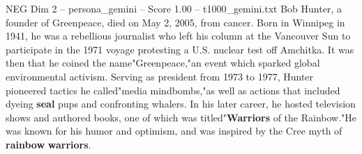 \begin{textsample}{NEG Dim 2 – persona\_gemini – Score 1.00 – t1000\_gemini.txt}  \label{ex:f2_neg_006}
Bob Hunter, a founder of Greenpeace, died on May 2, 2005, from cancer.
Born in Winnipeg in 1941, he was a rebellious journalist who left his column at the Vancouver Sun to participate in the 1971 voyage protesting a U.S. nuclear test off Amchitka.
It was then that he coined the name"Greenpeace,"an event which sparked global environmental activism.
Serving as president from 1973 to 1977, Hunter pioneered tactics he called"media mindbombs,"as well as actions that included dyeing \textbf{seal} pups and confronting whalers.
In his later career, he hosted television shows and authored books, one of which was titled"\textbf{Warriors} of the Rainbow."He was known for his humor and optimism, and was inspired by the Cree myth of \textbf{rainbow} \textbf{warriors}.

\end{textsample}

